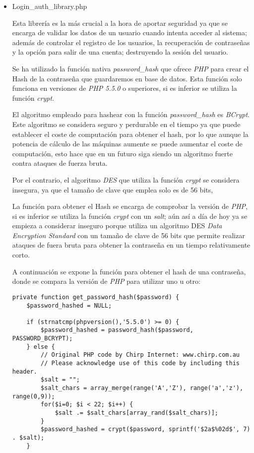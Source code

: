    \begin{itemize}
        \item Login\_auth\_library.php

            Esta librería es la más crucial a la hora de aportar seguridad ya que se encarga de validar los datos de un usuario cuando intenta acceder al sistema; además de controlar el registro de los usuarios, la recuperación de contraseñas y la opción para salir de una cuenta; destruyendo la sesión del usuario.

            Se ha utilizado la función nativa \emph{password\_hash} que ofrece \emph{PHP} para crear el Hash de la contraseña que guardaremos en base de datos. Esta función solo funciona en versiones de \emph{PHP 5.5.0} o superiores, si es inferior se utiliza la función \emph{crypt}.

            El algoritmo empleado para hashear con la función \emph{password\_hash} es \emph{BCrypt}. Este algoritmo se considera seguro y perdurable en el tiempo ya que puede establecer el coste de computación para obtener el hash, por lo que aunque la potencia de cálculo de las máquinas aumente se puede aumentar el coste de computación, esto hace que en un futuro siga siendo un algoritmo fuerte contra ataques de fuerza bruta.

            Por el contrario, el algoritmo \emph{DES} que utiliza la función \emph{crypt} se considera insegura, ya que el tamaño de clave que emplea solo es de 56 bits,

            La función para obtener el Hash se encarga de comprobar la versión de \emph{PHP}, si es inferior se utiliza la función \emph{crypt} con un \emph{salt}; aún así a día de hoy ya se empieza a considerar inseguro porque utiliza un algoritmo DES \emph{Data Encryption Standard} con un tamaño de clave de 56 bits que permite realizar ataques de fuera bruta para obtener la contraseña en un tiempo relativamente corto.

            A continuación se expone la función para obtener el hash de una contraseña, donde se compara la versión de \emph{PHP} para utilizar uno u otro:

            \begin{lstlisting}
private function get_password_hash($password) {
    $password_hashed = NULL;

    if (strnatcmp(phpversion(),'5.5.0') >= 0) {
        $password_hashed = password_hash($password, PASSWORD_BCRYPT);
    } else {
        // Original PHP code by Chirp Internet: www.chirp.com.au
        // Please acknowledge use of this code by including this header.
        $salt = "";
        $salt_chars = array_merge(range('A','Z'), range('a','z'), range(0,9));
        for($i=0; $i < 22; $i++) {
            $salt .= $salt_chars[array_rand($salt_chars)];
        }
        $password_hashed = crypt($password, sprintf('$2a$%02d$', 7) . $salt);
    }


\end{lstlisting}
\end{itemize}
